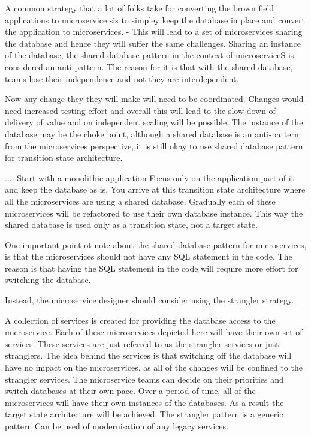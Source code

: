 A common strategy that a lot of folks take for converting the brown field applications to microservice sis to simpley keep the database in place and convert the application to microservices.
- This will lead to a set of microservices sharing the database and hence they will suffer the same challenges.
Sharing an instance of the database, the shared database pattern in the context of microserviceS is considered an anti-pattern.
The reason for it is that with the shared database, teams lose their independence and not they are interdependent.

Now any change they they will make will need to be coordinated.
Changes would need increased testing effort and overall this will lead to the slow down of delivery of value and on independent scaling will be possible.
The instance of the database may be the choke point, although a shared database is an anti-pattern from the microservices perspective, it is still okay to use shared database pattern for transition state architecture.

....
Start with a monolithic application
Focus only on the application part of it and keep the database as is.
You arrive at this transition state architecture where all the microservices are using a shared database.
Gradually each of these microservices will be refactored to use their own database instance.
This way the shared database is used only as a transition state, not a target state.

One important point ot note about the shared database pattern for microservices, is that the microservices should not have any SQL statement in the code.
The reason is that having the SQL statement in the code will require more effort for switching the database.

Instead, the microservice designer should consider using the strangler strategy.

A collection of services is created for providing the database access to the microservice.
Each of these microservices depicted here will have their own set of services.
These services are just referred to as the strangler services or just stranglers.
The idea behind the services is that switching off the database will have no impact on the microservices, as all of the changes will be confined to the strangler services.
The microservice teams can decide on their priorities and switch databases at their own pace.
Over a period of time, all of the microservices will have their own instances of the databases.
As a result the target state architecture will be achieved.
The strangler pattern is a generic pattern
Can be used of modernisation of any legacy services.

